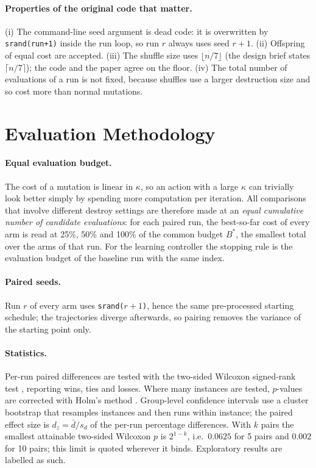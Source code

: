 \paragraph{Properties of the original code that matter.} (i) The command-line seed argument is dead code: it is overwritten by \texttt{srand(run+1)} inside the run loop, so run $r$ always uses seed $r+1$. (ii) Offspring of equal cost are accepted. (iii) The shuffle size uses $\lfloor n/7\rfloor$ (the design brief states $\lceil n/7\rceil$); the code and the paper agree on the floor. (iv) The total number of evaluations of a run is not fixed, because shuffles use a larger destruction size and so cost more than normal mutations.


\section{Evaluation Methodology}\label{sec:evalmethod}

\paragraph{Equal evaluation budget.} The cost of a mutation is linear in $\kappa$, so an action with a large $\kappa$ can trivially look better simply by spending more computation per iteration. All comparisons that involve different destroy settings are therefore made at an \emph{equal cumulative number of candidate evaluations}: for each paired run, the best-so-far cost of every arm is read at 25\%, 50\% and 100\% of the common budget $B^{*}$, the smallest total over the arms of that run. For the learning controller the stopping rule is the evaluation budget of the baseline run with the same index.

\paragraph{Paired seeds.} Run $r$ of every arm uses \texttt{srand(}$r+1$\texttt{)}, hence the same pre-processed starting schedule; the trajectories diverge afterwards, so pairing removes the variance of the starting point only.

\paragraph{Statistics.} Per-run paired differences are tested with the two-sided Wilcoxon signed-rank test \cite{wilcoxon1945}, reporting wins, ties and losses. Where many instances are tested, $p$-values are corrected with Holm's method \cite{holm1979}. Group-level confidence intervals use a cluster bootstrap that resamples instances and then runs within instance; the paired effect size is $d_z=\bar d/s_d$ of the per-run percentage differences. With $k$ pairs the smallest attainable two-sided Wilcoxon $p$ is $2^{1-k}$, i.e.\ $0.0625$ for 5 pairs and $0.002$ for 10 pairs; this limit is quoted wherever it binds. Exploratory results are labelled as such.

